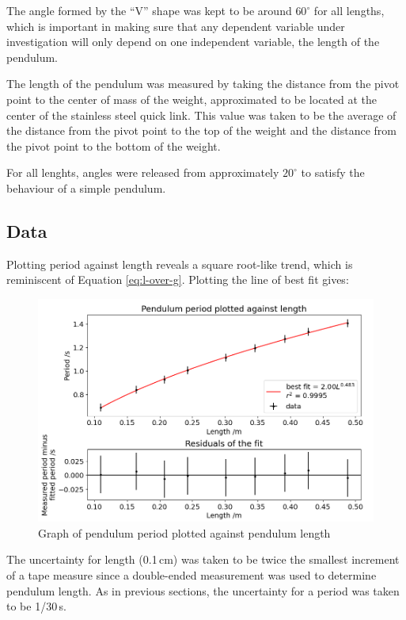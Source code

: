 \documentclass[12pt]{article}
\begin{document}
{{The angle formed by the ``V'' shape was kept to be around $60^\circ$ for all lengths, which is important in making sure that any dependent variable under investigation will only depend on one independent variable, the length of the pendulum.

The length of the pendulum was measured by taking the distance from the pivot point to the center of mass of the weight, approximated to be located at the center of the stainless steel quick link. This value was taken to be the average of the distance from the pivot point to the top of the weight and the distance from the pivot point to the bottom of the weight.

For all lenghts, angles were released from approximately $20^\circ$ to satisfy the behaviour of a simple pendulum.

\newpage

\subsection{Data}
Plotting period against length reveals a square root-like trend, which is reminiscent of Equation \ref{eq:l-over-g}. Plotting the line of best fit gives:

\begin{figure}[!hptb]
    \centering
    \includegraphics[width=\textwidth]{../figures/period_vs_length.png}
    \caption{\centering Graph of pendulum period plotted against pendulum length}
    \label{fig:figure 6}
\end{figure}

The uncertainty for length (0.1\,cm) was taken to be twice the smallest increment of a tape measure since a double-ended measurement was used to determine pendulum length. As in previous sections, the uncertainty for a period was taken to be 1/30\,s.

}}
\end{document}
